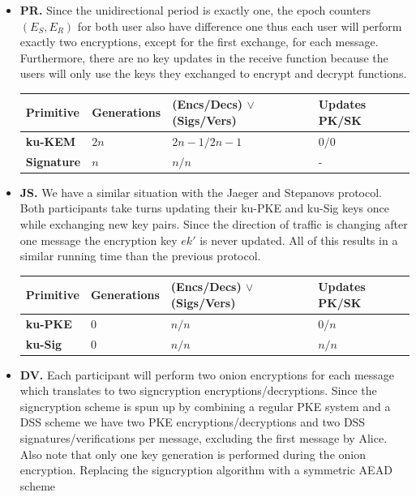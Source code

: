 \documentclass[11pt,a4paper,twoside,openright,bibliography=totoc]{scrbook}
\begin{document}
\begin{itemize}
\item \textbf{PR.} Since the unidirectional period is exactly one,
  the epoch counters $(E_S,E_R)$ for both user also have difference one
  thus each user will perform exactly two encryptions, except for the
  first exchange, for each message.
  Furthermore, there are no key updates in the receive function because
  the users will only use the keys they exchanged to encrypt and decrypt
  functions.
  \begin{center}
    \begin{tabular}{ | l | l | l | l |}
    \hline
    Primitive & Generations & (Encs/Decs) $\vee$ (Sigs/Vers) & Updates PK/SK \\ \hline
    \textbf{ku-KEM} & $2n$ & $2n-1/2n-1$ & $0/0$ \\ \hline
    \textbf{Signature} & $n$ & $n/n$ & - \\  
    \hline
    \end{tabular}
  \end{center}
\item \textbf{JS.} We have a similar situation with the Jaeger and Stepanovs
  protocol. Both participants take turns updating their ku-PKE and
  ku-Sig keys once while exchanging new key pairs. Since the direction
  of traffic is changing after one message the encryption key $ek'$
  is never updated. All of this results in a similar running time
  than the previous protocol.
  \begin{center}
    \begin{tabular}{ | l | l | l | l |}
    \hline
    Primitive & Generations & (Encs/Decs) $\vee$ (Sigs/Vers) & Updates PK/SK \\ \hline
    \textbf{ku-PKE} & $0$ & $n/n$ & $0/n$ \\ \hline
    \textbf{ku-Sig} & $0$ & $n/n$ & $n/n$ \\  
    \hline
    \end{tabular}
  \end{center}
\item \textbf{DV.} Each participant will perform two onion encryptions
  for each message which translates to two signcryption
  encryptions/decryptions. Since the signcryption scheme is spun up by combining
  a regular PKE system and a DSS scheme we have two PKE encryptions/decryptions
  and two DSS signatures/verifications per message, excluding
  the first message by Alice. Also note that
  only one key generation is performed during the onion encryption.
  Replacing the signcryption algorithm with a symmetric AEAD scheme

\end{itemize}
\end{document}
